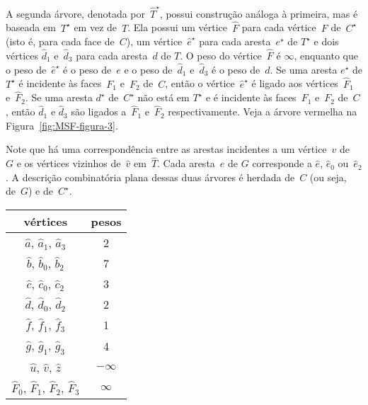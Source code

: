 A segunda árvore, denotada por~$\hat T^\star$, possui construção análoga à primeira, mas é baseada em~$T^\star$ em vez de~$T$.
Ela possui um vértice~$\hat F$ para cada vértice~$F$ de~$C^\star$ (isto é, para cada face de~$C$), um vértice~$\hat e^\star$ para cada aresta~$e^\star$ de $T^\star$ e dois vértices $\hat d_1$ e~$\hat d_3$ para cada aresta~$d$ de $T$.
O peso do vértice~$\hat F$ é $\infty$, enquanto que o peso de~$\hat e^\star$ é o peso de~$e$ e o peso de~$\hat d_1$ e~$\hat d_3$ é o peso de~$d$.
Se uma aresta $e^\star$ de $T^\star$ é incidente às faces~$F_1$ e~$F_2$ de~$C$, então o vértice~$\hat e^\star$ é ligado aos vértices~$\hat F_1$ e~$\hat F_2$.
Se uma aresta $d^\star$ de~$C^\star$ não está em $T^\star$ e é incidente às faces~$F_1$ e~$F_2$ de~$C$, então $\hat d_1$ e $\hat d_3$ são ligados a~$\hat F_1$ e~$\hat F_2$ respectivamente.
Veja a árvore vermelha na Figura~\ref{fig:MSF-figura-3}.

Note que há uma correspondência entre as arestas incidentes a um vértice~$v$ de~$G$ e os vértices vizinhos de~$\hat v$ em~$\hat T$.
Cada aresta~$e$ de $G$ corresponde a $\hat e$, $\hat e_0$ ou~$\hat e_2$. 
A descrição combinatória plana dessas duas árvores é herdada de~$C$ (ou seja, de~$G$) e de~$C^\star$.



\begin{minipage}[b]{0.4\textwidth}
\centering
\begin{tabular}{| c  c |} 
 \hline
 vértices & pesos\\
 \hline
 $\hat a$, $\hat a_1$, $\hat a_3$ & 2 \\ 
 \hline
 $\hat b$, $\hat b_0$, $\hat b_2$ & 7 \\
 \hline
 $\hat c$, $\hat c_0$, $\hat c_2$ & 3 \\
 \hline
 $\hat d$, $\hat d_0$, $\hat d_2$ & 2 \\
 \hline
 $\hat f$, $\hat f_1$, $\hat f_3$ & 1 \\
 \hline
 $\hat g$, $\hat g_1$, $\hat g_3$ & 4 \\
 \hline
 $\hat u$, $\hat v$, $\hat z$ & $-\infty$ \\
 \hline
 $\hat F_0$, $\hat F_1$, $\hat F_2$, $\hat F_3$ & $\infty$ \\
 \hline
\end{tabular}
\end{minipage}
\hfill
\begin{minipage}[b]{0.5\textwidth}
    \centering

\label{fig:MSF-figura-3}
    \end{minipage}


